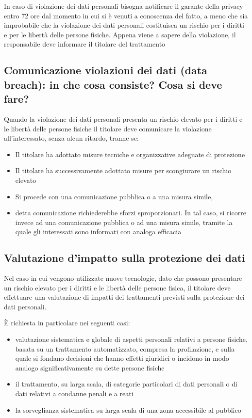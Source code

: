 In caso di violazione dei dati personali bisogna notificare il garante della
privacy entro 72 ore dal momento in cui si è venuti a conoscenza del fatto, a
meno che sia improbabile che la violazione dei dati personali costituisca un
rischio per i diritti e per le libertà delle persone fisiche.
\newline
Appena viene a sapere della violazione, il responsabile deve informare il titolare del trattamento

\subsection{Comunicazione violazioni dei dati (data breach): in che cosa consiste? Cosa si deve fare?}

Quando la violazione dei dati personali presenta un rischio elevato per i
diritti e le libertà delle persone fisiche il titolare deve comunicare la
violazione all'interessato, senza alcun ritardo, tranne se:
\begin{itemize}
    \item Il titolare ha adottato misure tecniche e organizzative adeguate di protezione
    \item Il titolare ha successivamente adottato misure per scongiurare un rischio elevato
    \item Si procede con una comunicazione pubblica o a una misura simile,
    \item detta comunicazione richiederebbe sforzi sproporzionati. In tal caso,
        si ricorre invece ad una comunicazione pubblica o ad una misura simile,
        tramite la quale gli interessati sono informati con analoga efficacia
\end{itemize}

\subsection{Valutazione d’impatto sulla protezione dei dati}

Nel caso in cui vengono utilizzate nuove tecnologie, dato che possono
presentare un rischio elevato per i diritti e le libertà delle persone fisica,
il titolare deve effettuare una valutazione di impatti dei trattamenti previsti
sulla protezione dei dati personali.
\newline
\par
È richiesta in particolare nei seguenti casi:
\begin{itemize}
    \item valutazione sistematica e globale di aspetti personali
        relativi a persone fisiche, basata su un trattamento
        automatizzato, compresa la profilazione, e sulla quale si
        fondano decisioni che hanno effetti giuridici o incidono
        in modo analogo significativamente su dette persone
        fisiche
    \item il trattamento, su larga scala, di categorie particolari di
        dati personali o di dati relativi a condanne penali e a reati
    \item la sorveglianza sistematica su larga scala di una zona
        accessibile al pubblico
\end{itemize}

